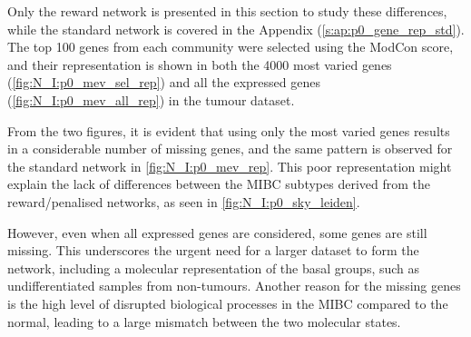 Only the reward network is presented in this section to study these differences, while the standard network is covered in the Appendix (\cref{s:ap:p0_gene_rep_std}). The top 100 genes from each community were selected using the ModCon score, and their representation is shown in both the 4000 most varied genes (\cref{fig:N_I:p0_mev_sel_rep}) and all the expressed genes (\cref{fig:N_I:p0_mev_all_rep}) in the tumour dataset.

From the two figures, it is evident that using only the most varied genes results in a considerable number of missing genes, and the same pattern is observed for the standard network in \cref{fig:N_I:p0_mev_rep}. This poor representation might explain the lack of differences between the MIBC subtypes derived from the reward/penalised networks, as seen in \cref{fig:N_I:p0_sky_leiden}.

However, even when all expressed genes are considered, some genes are still missing. This underscores the urgent need for a larger dataset to form the network, including a molecular representation of the basal groups, such as undifferentiated samples from non-tumours. Another reason for the missing genes is the high level of disrupted biological processes in the MIBC compared to the normal, leading to a large mismatch between the two molecular states.


